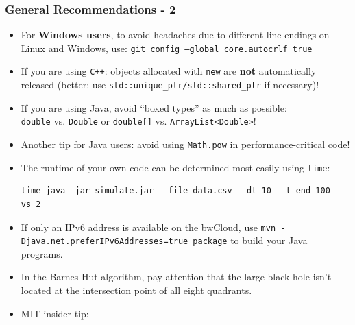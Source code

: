 \begin{frame}[fragile]
    \frametitle{General Recommendations - 2}
    \begin{itemize}
    \item For \textbf{Windows users}, to avoid headaches due to different line endings on Linux and Windows, use:
    \texttt{git config --global core.autocrlf true}
    \item If you are using \texttt{C++}: objects allocated with \texttt{new} are \textbf{not} automatically released (better: use \texttt{std::unique_ptr/std::shared_ptr} if necessary)!
    \item If you are using Java, avoid \enquote{boxed types} as much as possible:\\
    \texttt{double} vs. \texttt{Double} or \texttt{double[]} vs. \texttt{ArrayList<Double>}!
    \item Another tip for Java users: avoid using \texttt{Math.pow} in performance-critical code!
    \item The runtime of your own code can be determined most easily using \texttt{time}: \\[-.7em]
    {
        \small
        \begin{verbatim}
time java -jar simulate.jar --file data.csv --dt 10 --t_end 100 --vs 2
        \end{verbatim}
    }%
    \vspace*{-1.75em}
    \item If only an IPv6 address is available on the bwCloud, use \texttt{mvn -Djava.net.preferIPv6Addresses=true package} to build your Java programs. 
    \item In the Barnes-Hut algorithm, pay attention that the large black hole isn't located at the intersection point of all eight quadrants. 
    \item MIT insider tip: 
    \end{itemize}
\end{frame}


